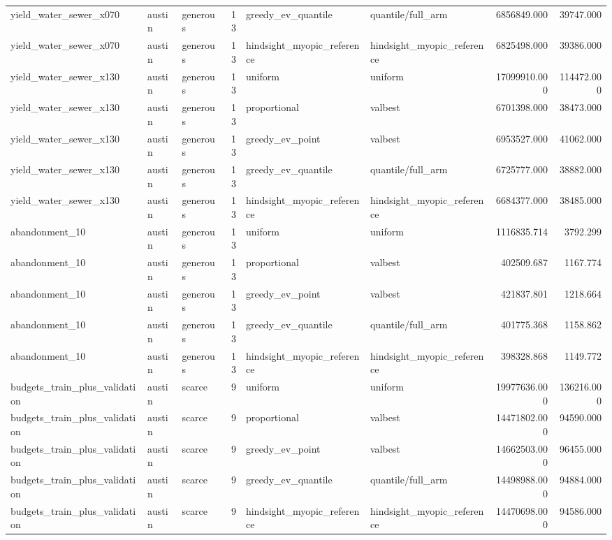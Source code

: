 \begin{tabular}{lllrllrr}
yield\_water\_sewer\_x070 & austin & generous & 13 & greedy\_ev\_quantile & quantile/full\_arm & 6856849.000 & 39747.000 \\
yield\_water\_sewer\_x070 & austin & generous & 13 & hindsight\_myopic\_reference & hindsight\_myopic\_reference & 6825498.000 & 39386.000 \\
yield\_water\_sewer\_x130 & austin & generous & 13 & uniform & uniform & 17099910.000 & 114472.000 \\
yield\_water\_sewer\_x130 & austin & generous & 13 & proportional & valbest & 6701398.000 & 38473.000 \\
yield\_water\_sewer\_x130 & austin & generous & 13 & greedy\_ev\_point & valbest & 6953527.000 & 41062.000 \\
yield\_water\_sewer\_x130 & austin & generous & 13 & greedy\_ev\_quantile & quantile/full\_arm & 6725777.000 & 38882.000 \\
yield\_water\_sewer\_x130 & austin & generous & 13 & hindsight\_myopic\_reference & hindsight\_myopic\_reference & 6684377.000 & 38485.000 \\
abandonment\_10 & austin & generous & 13 & uniform & uniform & 1116835.714 & 3792.299 \\
abandonment\_10 & austin & generous & 13 & proportional & valbest & 402509.687 & 1167.774 \\
abandonment\_10 & austin & generous & 13 & greedy\_ev\_point & valbest & 421837.801 & 1218.664 \\
abandonment\_10 & austin & generous & 13 & greedy\_ev\_quantile & quantile/full\_arm & 401775.368 & 1158.862 \\
abandonment\_10 & austin & generous & 13 & hindsight\_myopic\_reference & hindsight\_myopic\_reference & 398328.868 & 1149.772 \\
budgets\_train\_plus\_validation & austin & scarce & 9 & uniform & uniform & 19977636.000 & 136216.000 \\
budgets\_train\_plus\_validation & austin & scarce & 9 & proportional & valbest & 14471802.000 & 94590.000 \\
budgets\_train\_plus\_validation & austin & scarce & 9 & greedy\_ev\_point & valbest & 14662503.000 & 96455.000 \\
budgets\_train\_plus\_validation & austin & scarce & 9 & greedy\_ev\_quantile & quantile/full\_arm & 14498988.000 & 94884.000 \\
budgets\_train\_plus\_validation & austin & scarce & 9 & hindsight\_myopic\_reference & hindsight\_myopic\_reference & 14470698.000 & 94586.000 \\

\end{tabular}
